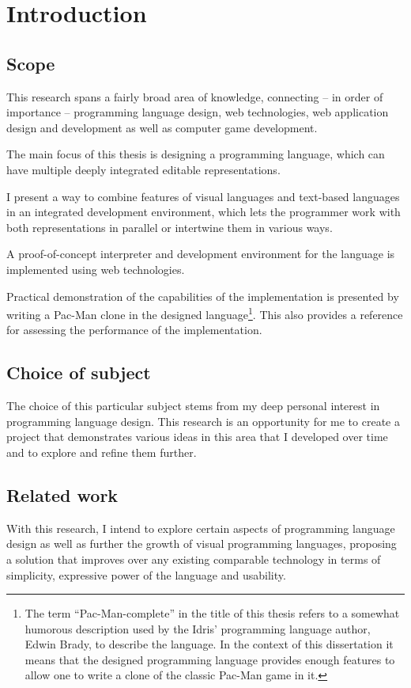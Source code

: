 \chapter{Introduction}\label{chap:intro}

\section{Scope}
This research spans a fairly broad area of knowledge, connecting -- in order of importance -- programming language design, web technologies, web application design and development as well as computer game development.

The main focus of this thesis is designing a programming language, which can have multiple deeply integrated editable representations.

I present a way to combine features of visual languages and text-based languages in an integrated development environment, which lets the programmer work with both representations in parallel or intertwine them in various ways.

A proof-of-concept interpreter and development environment for the language is implemented using web technologies.

Practical demonstration of the capabilities of the implementation is presented by writing a Pac-Man clone in the designed language\footnote{The term ``Pac-Man-complete'' in the title of this thesis refers to a somewhat humorous description used by the Idris' programming language\cite{idris} author, Edwin Brady\cite{pacman_complete, type_theory_podcast}, to describe the language. In the context of this dissertation it means that the designed programming language provides enough features to allow one to write a clone of the classic Pac-Man game in it.}. This also provides a reference for assessing the performance of the implementation.

\section{Choice of subject}
The choice of this particular subject stems from my deep personal interest in programming language design. This research is an opportunity for me to create a project that demonstrates various ideas in this area that I developed over time and to explore and refine them further.

\clearpage
\section{Related work}
With this research, I intend to explore certain aspects of programming language design as well as further the growth of visual programming languages, proposing a solution that improves over any existing comparable technology in terms of simplicity, expressive power of the language and usability.

